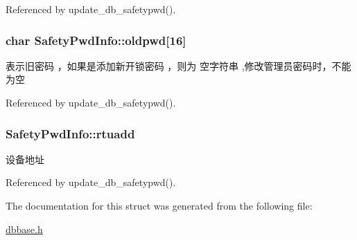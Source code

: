 Referenced by update\-\_\-db\-\_\-safetypwd().

\hypertarget{structSafetyPwdInfo_a0f10f1bb0eca709fc945b4aff9bbe262}{
\subsubsection[{oldpwd}]{\setlength{\rightskip}{0pt plus 5cm}char Safety\-Pwd\-Info\-::oldpwd\mbox{[}16\mbox{]}}}\label{structSafetyPwdInfo_a0f10f1bb0eca709fc945b4aff9bbe262}


表示旧密码 ，如果是添加新开锁密码 ，则为 空字符串 ,修改管理员密码时，不能为空 



Referenced by update\-\_\-db\-\_\-safetypwd().

\hypertarget{structSafetyPwdInfo_a4ac6a0e4ac9b9b19a2c8d5f1b47b822c}{
\subsubsection[{rtuadd}]{ Safety\-Pwd\-Info\-::rtuadd}}\label{structSafetyPwdInfo_a4ac6a0e4ac9b9b19a2c8d5f1b47b822c}


设备地址 



Referenced by update\-\_\-db\-\_\-safetypwd().



The documentation for this struct was generated from the following file\-:\begin{DoxyCompactItemize}
\item 
\hyperlink{dbbase_8h}{dbbase.\-h}\end{DoxyCompactItemize}
